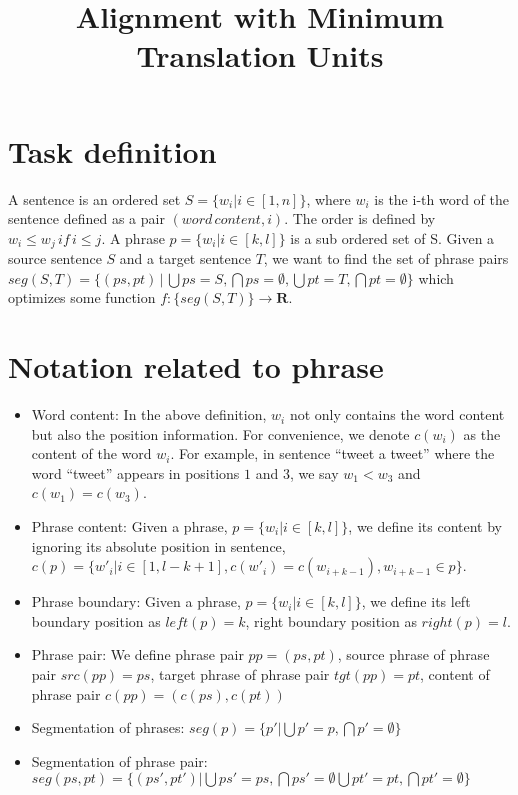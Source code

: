 \documentclass[11pt, oneside]{article}   	%
\title{Alignment with Minimum Translation Units}
\begin{document}
\maketitle
\section{Task definition}
A sentence is an ordered set $S=\{w_i | i \in [1,n]\} $, where $w_i$ is the i-th word of the sentence defined as a pair $(word \, content, i)$. The order is defined by $w_i \leqslant w_j \, if \, i \leqslant j $.  A phrase $p=\{w_i | i \in [k,l] \} $ is a sub ordered set of S. Given a source sentence $S$ and a target sentence $T$, we want to find the set of phrase pairs $seg(S,T)=\{(ps,pt) \, | \, \bigcup ps = S, \bigcap ps = \emptyset,  \bigcup pt = T, \bigcap pt = \emptyset \}$ which optimizes some function $f: \{seg(S,T)\} \rightarrow \mathbf{R}$.  

\section{Notation related to phrase}

\begin{itemize}
\item Word content: In the above definition, $w_i$ not only contains the word content but also the position information. For convenience, we denote $c(w_i)$ as the content of the word $w_i$. For example, in sentence ``tweet a tweet'' where the word ``tweet'' appears in positions $1$ and $3$, we say $w_1 < w_3$ and $c(w_1) = c(w_3)$.
\item Phrase content: Given a phrase, $p=\{w_i | i \in [k,l] \}$, we define its content by ignoring its absolute position in sentence,  $c(p)=\{ w'_i | i \in [1,l-k+1], c(w'_i)=c(w_{i+k-1}), w_{i+k-1} \in p \}$.

\item Phrase boundary: Given a phrase, $p=\{w_i | i \in [k,l] \}$, we define its left boundary position as $left(p)=k$, right boundary position as $right(p)=l$. 

\item Phrase pair: We define phrase pair $pp=(ps,pt)$, source phrase of phrase pair $src(pp)=ps$, target phrase of phrase pair $tgt(pp)=pt$, content of phrase pair $c(pp)=(c(ps),c(pt))$

\item Segmentation of phrases: $seg(p)=\{p'| \bigcup p' = p, \bigcap p' = \emptyset\}$

\item Segmentation of phrase pair: $seg(ps,pt)=\{(ps',pt')| \bigcup ps' = ps, \bigcap ps' = \emptyset \bigcup pt' = pt, \bigcap pt' = \emptyset\}$
\end{itemize}
\end{document}
